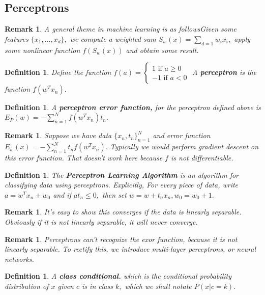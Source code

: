 \documentclass{amsart}
\newtheorem{defn}[subsubsection]{Definition}
\newtheorem{rem}[subsubsection]{Remark}
\begin{document}
\subsection{Perceptrons}

\begin{rem}
A general theme in machine learning is as followsGiven some features $\{x_1, \ldots, x_d\},$ we compute a weighted sum $S_w(x) = \sum_{d=1} w_ix_i,$ apply some nonlinear function $f(S_w(x))$ and obtain some result.
\end{rem}

\begin{defn}
Define the function $f(a) = \begin{cases} 1 \mbox { if } a \geq 0 \\ -1 \mbox { if } a < 0 \end{cases}$
A {\bf perceptron} is the function $f(w^Tx_n).$
\end{defn}
\begin{defn}
A {\bf perceptron error function,} for the perceptron defined above is $E_P(w) = -\sum_{n=1}^N f(w^T x_n) t_n.$
\end{defn}

\begin{rem}
Suppose we have data $\{x_n,t_n\}_{n=1}^N$ and error function $E_w(x)= -\sum_{n=1}^N t_nf(w^Tx_n).$ Typically we would perform gradient descent on this error function. That doesn't work here because $f$ is not differentiable.
\end{rem}

\begin{defn}
The {\bf Perceptron Learning Algorithm} is an algorithm for classifying data using perceptrons. Explicitly,
For every piece of data, write $a = w^Tx_n + w_0$ and if $at_n \leq 0,$ then set $w = w+t_nx_n, w_0 = w_0 + 1.$ 
\end{defn}

\begin{rem}
It's easy to show this converges if the data is linearly separable. Obviously if it is not linearly separable, it will never converge.
\end{rem}

\begin{rem}
Perceptrons can't recognize the exor function, because it is not linearly separable. To rectify this, we introduce multi-layer perceptrons, or neural networks.
\end{rem}

\begin{defn}
A {\bf class conditional.} which is the conditional probability distribution of $x$ given $c$ is in class $k,$ which we shall notate $P(x|c=k).$ 
\end{defn}
\end{document}
